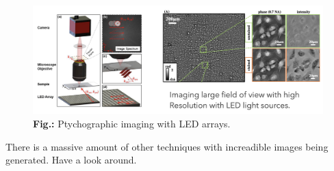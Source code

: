 \documentclass[
  a4paper,
]{book}
\begin{document}
\begin{figure}[H]

{\centering \includegraphics[width=1\linewidth,height=\textheight,keepaspectratio]{geometrical-optics/img/ptychography.png}

}

\caption{\textbf{Fig.:} Ptychographic imaging with LED arrays.}

\end{figure}%

There is a massive amount of other techniques with increadible images
being generated. Have a look around.
\end{document}
